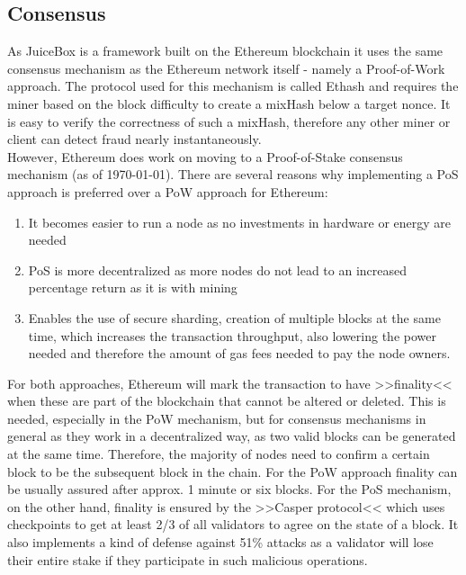 \documentclass[a4paper,12pt]{report}
\begin{document}
	    \subsection[Consensus]{Consensus \cite{EthDocs}}
	    \startsubsection
	        As JuiceBox is a framework built on the Ethereum blockchain it uses the same consensus mechanism as the Ethereum network itself - namely a Proof-of-Work approach. The protocol used for this mechanism is called Ethash and requires the miner based on the block difficulty to create a mixHash below a target nonce. It is easy to verify the correctness of such a mixHash, therefore any other miner or client can detect fraud nearly instantaneously. \\
	        However, Ethereum does work on moving to a Proof-of-Stake consensus mechanism (as of \today). There are several reasons why implementing a PoS approach is preferred over a PoW approach for Ethereum:
	        \begin{enumerate}[-]
	            \item It becomes easier to run a node as no investments in hardware or energy are needed
	            \item PoS is more decentralized as more nodes do not lead to an increased percentage return as it is with mining
	            \item Enables the use of secure sharding, creation of multiple blocks at the same time, which increases the transaction throughput, also lowering the power needed and therefore the amount of gas fees needed to pay the node owners.
	        \end{enumerate}
	        For both approaches, Ethereum will mark the transaction to have >>finality<< when these are part of the blockchain that cannot be altered or deleted. This is needed, especially in the PoW mechanism, but for consensus mechanisms in general as they work in a decentralized way, as two valid blocks can be generated at the same time. Therefore, the majority of nodes need to confirm a certain block to be the subsequent block in the chain. For the PoW approach finality can be usually assured after approx. 1 minute or six blocks. For the PoS mechanism, on the other hand, finality is ensured by the >>Casper protocol<< which uses checkpoints to get at least 2/3 of all validators to agree on the state of a block. It also implements a kind of defense against 51\% attacks as a validator will lose their entire stake if they participate in such malicious operations.
	    \closesection
\end{document}
